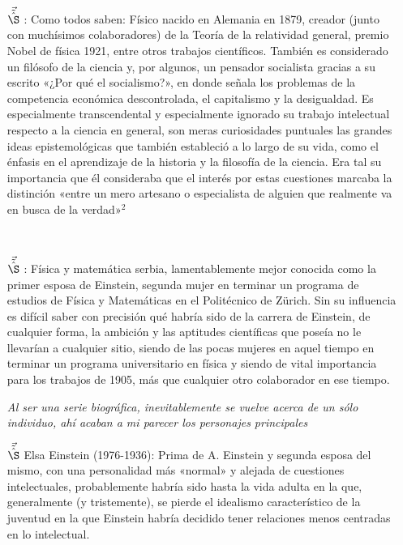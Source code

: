 \documentclass{article}
\begin{document}
\begin{itemize}

\item[$\vec{\tilde{\hat{\S}}}$] : Como todos saben: Físico nacido en Alemania en 1879, creador (junto con muchísimos colaboradores) de la Teoría de la relatividad general, premio Nobel de física 1921, entre otros trabajos científicos. También es considerado un filósofo de la ciencia y, por algunos, un pensador socialista gracias a su escrito «¿Por qué el socialismo?», en donde señala los problemas de la competencia económica descontrolada, el capitalismo y la desigualdad. Es especialmente transcendental y especialmente ignorado su trabajo intelectual respecto a la ciencia en general, son meras curiosidades puntuales las grandes ideas epistemológicas que también estableció a lo largo de su vida, como el énfasis en el aprendizaje de la historia y la filosofía de la ciencia. Era tal su importancia que él consideraba que el interés por estas cuestiones marcaba la distinción «entre un mero artesano o especialista de alguien que realmente va en busca de la verdad»$^2$

\

\item[$\vec{\tilde{\hat{\S}}}$] : Física y matemática serbia, lamentablemente mejor conocida como la primer esposa de Einstein, segunda mujer en terminar un programa de estudios de Física y Matemáticas en el Politécnico de Zürich. Sin su influencia es difícil saber con precisión qué habría sido de la carrera de Einstein, de cualquier forma, la ambición y las aptitudes científicas que poseía no le llevarían a cualquier sitio, siendo de las pocas mujeres en aquel tiempo en terminar un programa universitario en física y siendo de vital importancia para los trabajos de 1905, más que cualquier otro colaborador en ese tiempo.

\emph{\textcolor{YellowOrange}{Al ser una serie biográfica, inevitablemente se vuelve acerca de un sólo individuo, ahí acaban a mi parecer los personajes principales}}

\item[$\vec{\tilde{\hat{\S}}}$] Elsa Einstein (1976-1936): Prima de A. Einstein y segunda esposa del mismo, con una personalidad más «normal» y alejada de cuestiones intelectuales, probablemente habría sido hasta la vida adulta en la que, generalmente (y tristemente), se pierde el idealismo característico de la juventud en la que Einstein habría decidido tener relaciones menos centradas en lo intelectual.


\end{itemize}
\end{document}
